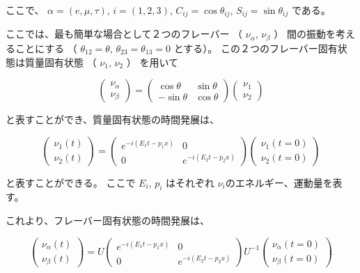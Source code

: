 ここで、
$\alpha = (e, \mu, \tau)$,
$i = (1, 2, 3)$,
$C_{ij} = \cos \theta_{ij}$,
$S_{ij} = \sin \theta_{ij}$
である。

ここでは、最も簡単な場合として２つのフレーバー
（
$\nu_{\alpha}$,
$\nu_{\beta}$
）
間の振動を考えることにする
（
$\theta_{12} = \theta$,
$\theta_{23} = \theta_{13} = 0$
とする）。
この２つのフレーバー固有状態は質量固有状態
（
$\nu_{1}$,
$\nu_{2}$
）
を用いて

\begin{equation}
    \begin{pmatrix}
        \nu_{\alpha}\\
        \nu_{\beta}
    \end{pmatrix}
    =
    \begin{pmatrix}
        \cos\theta & \sin\theta\\
        -\sin\theta & \cos\theta
    \end{pmatrix}
    \begin{pmatrix}
        \nu_{1}\\
        \nu_{2}
    \end{pmatrix}
\end{equation}

と表すことができ、質量固有状態の時間発展は、


\begin{equation}
    \begin{pmatrix}
        \nu_{1}(t)\\
        \nu_{2}(t)
    \end{pmatrix}
    =
    \begin{pmatrix}
        e^{-i(E_{1}t-p_{1}x)} & 0\\
        0 & e^{-i(E_{2}t-p_{2}x)}
    \end{pmatrix}
    \begin{pmatrix}
        \nu_{1}(t=0)\\
        \nu_{2}(t=0)
    \end{pmatrix}
\end{equation}

と表すことができる。
ここで
$E_{i}$,
$p_{i}$
はそれぞれ
$\nu_{i}$のエネルギー、運動量を表す。

これより、フレーバー固有状態の時間発展は、

\begin{equation}
    \begin{pmatrix}
        \nu_{\alpha}(t)\\
        \nu_{\beta}(t)
    \end{pmatrix}
    = U
    \begin{pmatrix}
        e^{-i(E_{1}t-p_{1}x)} & 0\\
        0 & e^{-i(E_{2}t-p_{2}x)}
    \end{pmatrix}
    U^{-1}
    \begin{pmatrix}
        \nu_{\alpha}(t=0)\\
        \nu_{\beta}(t=0) \label{equA}
    \end{pmatrix}
\end{equation}

